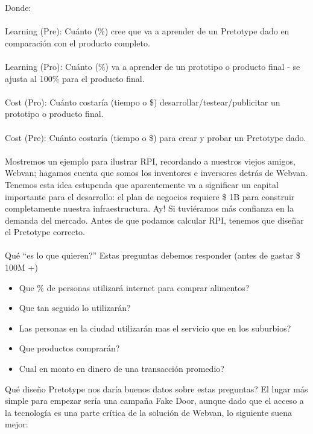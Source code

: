 \documentclass{article}
\begin{document}
Donde:
\\ \\
Learning (Pre):		Cu\'anto (\%) cree que va a aprender de un Pretotype dado en comparaci\'on con el producto completo.
\\ \\
Learning (Pro):		Cu\'anto (\%) va a aprender de un prototipo o producto final - se ajusta al 100\% para el producto final.
\\ \\
Cost (Pro):		Cu\'anto costar\'ia (tiempo o \$) desarrollar/testear/publicitar un prototipo o producto final.
\\ \\
Cost (Pre):		Cu\'anto costar\'ia (tiempo o \$) para crear y probar un Pretotype dado.
\\ \\
Mostremos un ejemplo para ilustrar RPI, recordando a nuestros viejos amigos, Webvan; hagamos cuenta que somos los inventores e inversores detr\'as de Webvan. Tenemos esta idea estupenda que aparentemente va a significar un capital importante para el desarrollo: el plan de negocios requiere \$ 1B para construir completamente nuestra infraestructura. Ay! Si tuvi\'eramos m\'as confianza en la demanda del mercado. Antes de que podamos calcular RPI, tenemos que dise\~nar el Pretotype correcto.
\\ \\
Qu\'e ``es lo que quieren?'' Estas preguntas debemos responder (antes de gastar \$ 100M +)

\begin{itemize}

\item Que \% de personas utilizar\'a internet para comprar alimentos?
\item Que tan seguido lo utilizar\'an?
\item Las personas en la ciudad utilizar\'an mas el servicio que en los suburbios?
\item Que productos comprar\'an?
\item Cual en monto en dinero de una transacci\'on promedio?

\end{itemize}

Qu\'e dise\~no Pretotype nos dar\'ia buenos datos sobre estas preguntas? El lugar m\'as simple para empezar ser\'ia una campa\~na Fake Door, aunque dado que el acceso a la tecnolog\'ia es una parte cr\'itica de la soluci\'on de Webvan, lo siguiente suena mejor:
\end{document}
